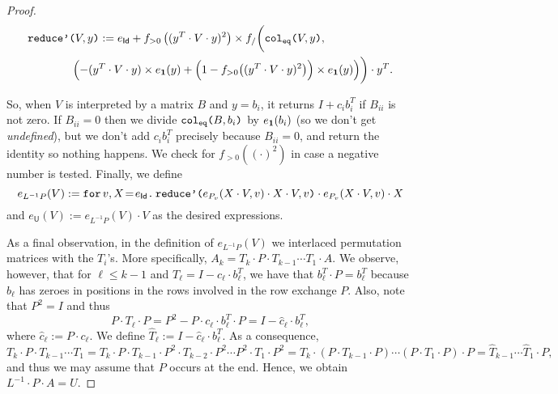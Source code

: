 \begin{proof}
    \begin{align*}
        &\redd{V}{y}:= e_{\mathsf{Id}}+ f_{>0}\left( ( y^T\cdot V\cdot y)^2 \right)\times f_/\biggl(\ccoleq{V}{y}, \\
        &\hspace{4em}\Bigl(-(y^T\cdot V\cdot y)\times e_{\ones}(y) + \Bigl( 1 - f_{>0}\bigl(( y^T\cdot V\cdot y)^2 \bigr) \Bigr)\times e_{\ones}(y) \Bigr)\biggr)\cdot y^T. \\
    \end{align*}
    
    So, when $V$ is interpreted by a matrix $B$ and $y=b_i$, it returns $I+c_ib_i^T$ if $B_{ii}$ is not zero. 
    If $B_{ii}=0$ then we divide $\ccoleq{B}{b_i}$ by $e_{\ones}(b_i)$ (so we don't get \textit{undefined}), 
    but we don't add $c_ib_i^T$ precisely because $B_{ii}=0$, and return the identity so nothing happens. We check 
    for $f_{>0}((\cdot)^2)$ in case a negative number is tested.
    Finally, we define
    $$
    e_{L^{-1}P}(V):=\initf{e_{\mathsf{Id}}}{v}{X}{\redd{e_{P_v}(X\cdot V,v)\cdot X\cdot V}{v}\cdot e_{P_v}(X\cdot V,v)\cdot X}
    $$
    and $e_{\mathsf{U}}(V):=e_{L^{-1}P}(V)\cdot V$ as the desired expressions.

    As a final observation, in the definition of $e_{L^{-1}P}(V)$ 
    we interlaced permutation matrices with the $T_i$'s. More specifically, 
    $A_k=T_k\cdot P\cdot T_{k-1}\cdots T_1\cdot A$. We observe, however, that for $\ell\leq k-1$ and
    $T_{\ell}=I-c_\ell\cdot b_\ell^T$, we have that  $b_\ell^T\cdot P=b_\ell^T$ because $b_\ell$ has zeroes in positions in the rows involved in the row exchange $P$. Also, note that  $P^2=I$ and thus 
    $$P\cdot T_\ell\cdot P=P^2-P\cdot c_\ell\cdot b_\ell^T\cdot P=I-\widehat{c}_\ell\cdot b_\ell^T,$$
where $\widehat{c}_\ell:=P\cdot c_\ell$. We define $\widehat{T}_\ell:=I-\widehat{c}_\ell\cdot b_\ell^T$.
    As a consequence,
    $$
    T_k\cdot P\cdot T_{k-1}\cdots T_1=T_k\cdot P\cdot T_{k-1}\cdot P^2\cdot T_{k-2}\cdot P^2\cdots P^2 \cdot T_1\cdot P^2=T_k\cdot (P\cdot T_{k-1}\cdot P)\cdots (P\cdot T_1\cdot P)\cdot P=\widehat{T}_{k-1}\cdots \widehat{T}_1\cdot P,
    $$
    and thus we may assume that $P$ occurs at the end. Hence, we obtain $L^{-1}\cdot P\cdot A=U$.
\end{proof}
